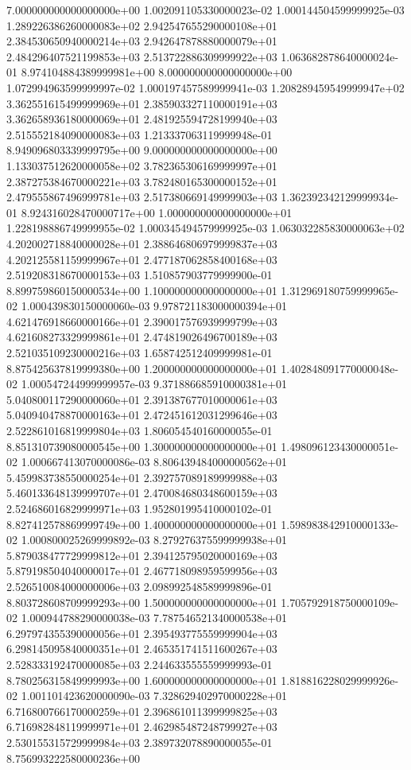 \documentclass{article}
\begin{document}
\begin{center}
{7.000000000000000000e+00 1.002091105330000023e-02 1.000144504599999925e-03 1.289226386260000083e+02 2.942547655290000108e+01 2.384530650940000214e+03 2.942647878880000079e+01 2.484296407521199853e+03 2.513722886309999922e+03 1.063682878640000024e-01 8.974104884389999981e+00
8.000000000000000000e+00 1.072994963599999997e-02 1.000197457589999941e-03 1.208289459549999947e+02 3.362551615499999969e+01 2.385903327110000191e+03 3.362658936180000069e+01 2.481925594728199940e+03 2.515552184090000083e+03 1.213337063119999948e-01 8.949096803339999795e+00
9.000000000000000000e+00 {\textemdash} {\textemdash} 1.133037512620000058e+02 3.782365306169999997e+01 2.387275384670000221e+03 3.782480165300000152e+01 2.479555867496999781e+03 2.517380669149999903e+03 1.362392342129999934e-01 8.924316028470000717e+00
1.000000000000000000e+01 1.228198886749999955e-02 1.000345494579999925e-03 1.063032285830000063e+02 4.202002718840000028e+01 2.388646806979999837e+03 4.202125581159999967e+01 2.477187062858400168e+03 2.519208318670000153e+03 1.510857903779999900e-01 8.899759860150000534e+00
1.100000000000000000e+01 1.312969180759999965e-02 1.000439830150000060e-03 9.978721183000000394e+01 4.621476918660000166e+01 2.390017576939999799e+03 4.621608273329999861e+01 2.474819026496700189e+03 2.521035109230000216e+03 1.658742512409999981e-01 8.875425637819999380e+00
1.200000000000000000e+01 1.402848091770000048e-02 1.000547244999999957e-03 9.371886685910000381e+01 5.040800117290000060e+01 2.391387677010000061e+03 5.040940478870000163e+01 2.472451612031299646e+03 2.522861016819999804e+03 1.806054540160000055e-01 8.851310739080000545e+00
1.300000000000000000e+01 1.498096123430000051e-02 1.000667413070000086e-03 8.806439484000000562e+01 5.459983738550000254e+01 2.392757089189999988e+03 5.460133648139999707e+01 2.470084680348600159e+03 2.524686016829999971e+03 1.952801995410000102e-01 8.827412578869999749e+00
1.400000000000000000e+01 1.598983842910000133e-02 1.000800025269999892e-03 8.279276375599999938e+01 5.879038477729999812e+01 2.394125795020000169e+03 5.879198504040000017e+01 2.467718098959599956e+03 2.526510084000000006e+03 2.098992548589999896e-01 8.803728608709999293e+00
1.500000000000000000e+01 1.705792918750000109e-02 1.000944788290000038e-03 7.787546521340000538e+01 6.297974355390000056e+01 2.395493775559999904e+03 6.298145095840000351e+01 2.465351741511600267e+03 2.528333192470000085e+03 2.244633555559999993e-01 8.780256315849999993e+00
1.600000000000000000e+01 1.818816228029999926e-02 1.001101423620000090e-03 7.328629402970000228e+01 6.716800766170000259e+01 2.396861011399999825e+03 6.716982848119999971e+01 2.462985487248799927e+03 2.530155315729999984e+03 2.389732078890000055e-01 8.756993222580000236e+00
}
\end{center}
\end{document}
